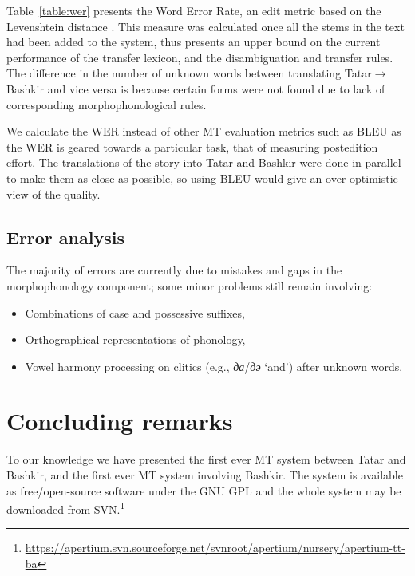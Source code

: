 \documentclass[11pt]{article}
\newenvironment{itemise}[1]{
        \begin{itemize}\setlength{\itemsep}{-0.3em}
        \vspace{-0.6em}
        #1
}{
        \end{itemize}
        \vspace{-1pt}
}
\begin{document}
Table~\ref{table:wer} presents the Word Error Rate, an edit metric based on the Levenshtein 
distance \citep{levenshtein/1966}. This measure was calculated once all the stems in the 
text had been added to the system, thus presents an upper bound on the current performance
of the transfer lexicon, and the disambiguation and transfer rules. The difference in 
the number of unknown words between translating Tatar$\rightarrow$Bashkir and vice versa
is because certain forms were not found due to lack of corresponding morphophonological rules.

We calculate the WER instead of other MT evaluation metrics such as BLEU as the WER is 
geared towards a particular task, that of measuring postedition effort. The translations 
of the story into Tatar and Bashkir were done in parallel to make them as close as possible,
so using BLEU would give an over-optimistic view of the quality.

\subsection{Error analysis}

The majority of errors are currently due to mistakes and gaps in the morphophonology component; some minor problems still remain involving:
\begin{itemise}
  \item Combinations of case and possessive suffixes,
  \item Orthographical representations of phonology,
  \item Vowel harmony processing on clitics (e.g., \emph{да}/\emph{дә} `and') after unknown words.
\end{itemise}




\section{Concluding remarks}
\label{sec:conc}

To our knowledge we have presented the first ever MT system between Tatar and Bashkir, and the first ever MT system involving Bashkir. The system is available as free/open-source software under the GNU GPL and the 
whole system may be downloaded from SVN.\footnote{\url{https://apertium.svn.sourceforge.net/svnroot/apertium/nursery/apertium-tt-ba}}
\end{document}
